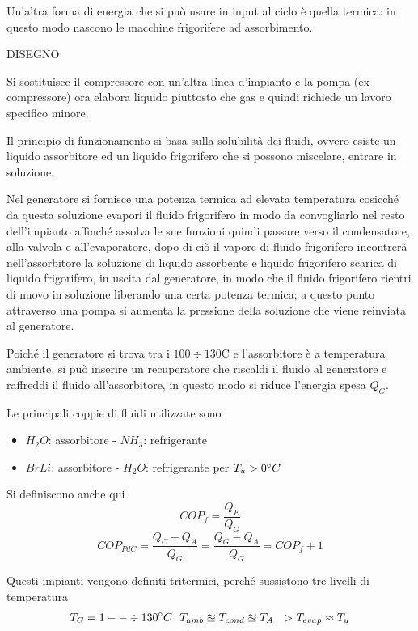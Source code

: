 \begin{adjustwidth}{2in}{}
	Un'altra forma di energia che si può usare in input al ciclo è quella termica: in questo modo nascono le macchine frigorifere ad assorbimento.
	
	DISEGNO
	
	Si sostituisce il compressore con un'altra linea d'impianto e la pompa (ex compressore) ora elabora liquido piuttosto che gas e quindi richiede un lavoro specifico minore. \newline 
	
	Il principio di funzionamento si basa sulla solubilità dei fluidi, ovvero esiste un liquido assorbitore ed un liquido frigorifero che si possono miscelare, entrare in soluzione.
	
	Nel generatore si fornisce una potenza termica ad elevata temperatura cosicché da questa soluzione evapori il fluido frigorifero in modo da convogliarlo nel resto dell'impianto affinché assolva le sue funzioni quindi passare verso il condensatore, alla valvola  e all'evaporatore, dopo di ciò il vapore di fluido frigorifero incontrerà nell'assorbitore la soluzione di liquido assorbente e liquido frigorifero scarica di liquido frigorifero, in uscita dal generatore, in modo che il fluido frigorifero rientri di nuovo in soluzione liberando una certa potenza termica; a questo punto attraverso una pompa si aumenta la pressione della soluzione che viene reinviata al generatore. 
	
	Poiché il generatore si trova tra i $100\div130$\degree C e l'assorbitore è a temperatura ambiente, si può inserire un recuperatore che riscaldi il fluido al generatore e raffreddi il fluido all'assorbitore, in questo modo si riduce l'energia spesa $Q_G$. \newline 
	
	Le principali coppie di fluidi utilizzate sono		
\begin{itemize}
		\item $H_2O$: assorbitore - $NH_3$: refrigerante
		\item $BrLi$: assorbitore - $H_2O$: refrigerante per $T_u>0\degree C$
\end{itemize}
	Si definiscono anche qui 
	\[COP_f = \dfrac{Q_E}{Q_G}\]
	\[COP_{PdC} = \dfrac{Q_C-Q_A}{Q_G} = \dfrac{Q_G-Q_A}{Q_G} = COP_f+1\]
	
	Questi impianti vengono definiti tritermici, perché sussistono tre livelli di temperatura
	\[T_G = 1--\div130\degree C ~~T_{amb}\approxeq T_{cond} \approxeq T_A ~~> T_{evap} \approx T_u \]
\end{adjustwidth}


